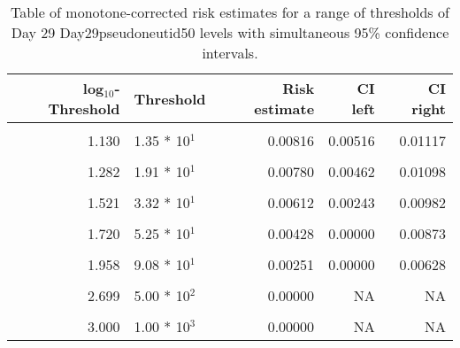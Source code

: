 \documentclass[]{article}
\begin{document}
\begin{table}[!h]

\caption{\label{tab:unnamed-chunk-59}Table of monotone-corrected risk estimates for a range of thresholds of Day 29 Day29pseudoneutid50 levels with simultaneous 95\% confidence intervals.}
\centering
\begin{tabular}[t]{rlrrr}
\toprule
log$_{10}$-Threshold & Threshold & Risk estimate & CI left & CI right\\
\midrule
\cellcolor{gray!6}{0.083} & \cellcolor{gray!6}{1.21 * 10$^{0}$} & \cellcolor{gray!6}{0.00855} & \cellcolor{gray!6}{0.00570} & \cellcolor{gray!6}{0.01140}\\
1.130 & 1.35 * 10$^{1}$ & 0.00816 & 0.00516 & 0.01117\\
\cellcolor{gray!6}{1.204} & \cellcolor{gray!6}{1.60 * 10$^{1}$} & \cellcolor{gray!6}{0.00816} & \cellcolor{gray!6}{0.00512} & \cellcolor{gray!6}{0.01121}\\
1.282 & 1.91 * 10$^{1}$ & 0.00780 & 0.00462 & 0.01098\\
\cellcolor{gray!6}{1.423} & \cellcolor{gray!6}{2.65 * 10$^{1}$} & \cellcolor{gray!6}{0.00655} & \cellcolor{gray!6}{0.00348} & \cellcolor{gray!6}{0.00962}\\
1.521 & 3.32 * 10$^{1}$ & 0.00612 & 0.00243 & 0.00982\\
\cellcolor{gray!6}{1.613} & \cellcolor{gray!6}{4.10 * 10$^{1}$} & \cellcolor{gray!6}{0.00547} & \cellcolor{gray!6}{0.00127} & \cellcolor{gray!6}{0.00968}\\
1.720 & 5.25 * 10$^{1}$ & 0.00428 & 0.00000 & 0.00873\\
\cellcolor{gray!6}{1.891} & \cellcolor{gray!6}{7.78 * 10$^{1}$} & \cellcolor{gray!6}{0.00354} & \cellcolor{gray!6}{0.00000} & \cellcolor{gray!6}{0.00848}\\
1.958 & 9.08 * 10$^{1}$ & 0.00251 & 0.00000 & 0.00628\\
\cellcolor{gray!6}{2.047} & \cellcolor{gray!6}{1.11 * 10$^{2}$} & \cellcolor{gray!6}{0.00247} & \cellcolor{gray!6}{0.00000} & \cellcolor{gray!6}{0.00543}\\
2.699 & 5.00 * 10$^{2}$ & 0.00000 & NA & NA\\
\cellcolor{gray!6}{2.828} & \cellcolor{gray!6}{6.73 * 10$^{2}$} & \cellcolor{gray!6}{0.00000} & \cellcolor{gray!6}{NA} & \cellcolor{gray!6}{NA}\\
3.000 & 1.00 * 10$^{3}$ & 0.00000 & NA & NA\\
\bottomrule
\end{tabular}
\end{table}
\end{document}
